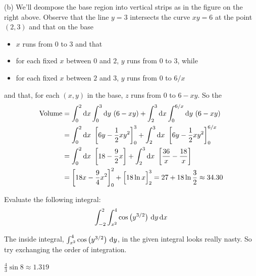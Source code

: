 \begin{solution}
(b) We'll deompose the base region into vertical strips as in the
figure on the right above.
Observe that the line $y=3$ intersects the curve $xy=6$ at the point $(2,3)$
and that on the base
\begin{itemize}
\item
$x$ runs from $0$ to $3$ and that
\item
for each fixed $x$ between $0$ and $2$, $y$ runs from $0$ to $3$, while
\item
for each fixed $x$ between $2$ and $3$, $y$ runs from $0$ to $6/x$
\end{itemize}
and that, for each $(x,y)$ in the base, $z$ runs from $0$ to $6-xy$.
So the 
\begin{align*}
\text{Volume}&=\int_0^2\mathrm{d}x\int_0^3\mathrm{d}y\ (6-xy)+
             \int_2^3\mathrm{d}x\int_0^{6/x} \mathrm{d}y\ (6-xy) \\
&=\int_0^2\mathrm{d}x\ \left[6y-\frac{1}{2} xy^2\right]_0^3
+\int_2^3\mathrm{d}x\ \left[6y-\frac{1}{2} xy^2\right]_0^{6/x} \\
&=\int_0^2\mathrm{d}x\ \left[18-\frac{9}{2}x\right]
+\int_2^3\mathrm{d}x\ \left[\frac{36}{x}-\frac{18}{x}\right] \\
&=\left[18x-\frac{9}{4}x^2\right]_0^2+\Big[18\ln x\Big]_2^3
=27+18\ln\frac{3}{2}\approx 34.30
\end{align*}
\end{solution}

\begin{question}[M200 2002D] %
Evaluate the following integral:
\begin{equation*}
\int_{-2}^2\int_{x^2}^4\cos\big(y^{3/2}\big)\ \dee{y}\,\dee{x}
\end{equation*}
\end{question}

\begin{hint}
The inside integral, $\int_{x^2}^4\cos\big(y^{3/2}\big)\ \mathrm{d}y$,
in the given integral looks really nasty.  So try exchanging
the order of integration.
\end{hint}

\begin{answer}
$\frac{4}{3}\sin 8\approx 1.319$
\end{answer}

